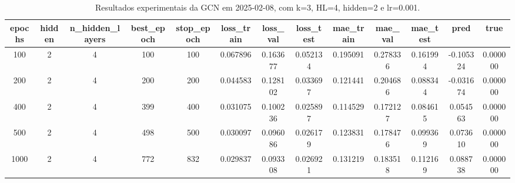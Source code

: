 \begin{table}[h]
\centering
\caption{Resultados experimentais da GCN em 2025-02-08, com k=3, HL=4, hidden=2 e lr=0.001.}
\label{tab:gcn_results_k3_hl4_h2_d20250208}
\begin{tabular}{ccccccccccccc}
\toprule
epochs & hidden & n\_hidden\_layers & best\_epoch & stop\_epoch & loss\_train & loss\_val & loss\_test & mae\_train & mae\_val & mae\_test & pred & true \\
\midrule
100 & 2 & 4 & 100 & 100 & 0.067896 & 0.163677 & 0.052134 & 0.195091 & 0.278336 & 0.161994 & -0.105324 & 0.000000 \\
200 & 2 & 4 & 200 & 200 & 0.044583 & 0.128102 & 0.033697 & 0.121441 & 0.204686 & 0.088344 & -0.031674 & 0.000000 \\
400 & 2 & 4 & 399 & 400 & 0.031075 & 0.100236 & 0.025897 & 0.114529 & 0.172127 & 0.084615 & 0.054563 & 0.000000 \\
500 & 2 & 4 & 498 & 500 & 0.030097 & 0.096086 & 0.026179 & 0.123831 & 0.178476 & 0.099369 & 0.073610 & 0.000000 \\
1000 & 2 & 4 & 772 & 832 & 0.029837 & 0.093308 & 0.026921 & 0.131219 & 0.183518 & 0.112169 & 0.088738 & 0.000000 \\
\bottomrule
\end{tabular}
\end{table}

